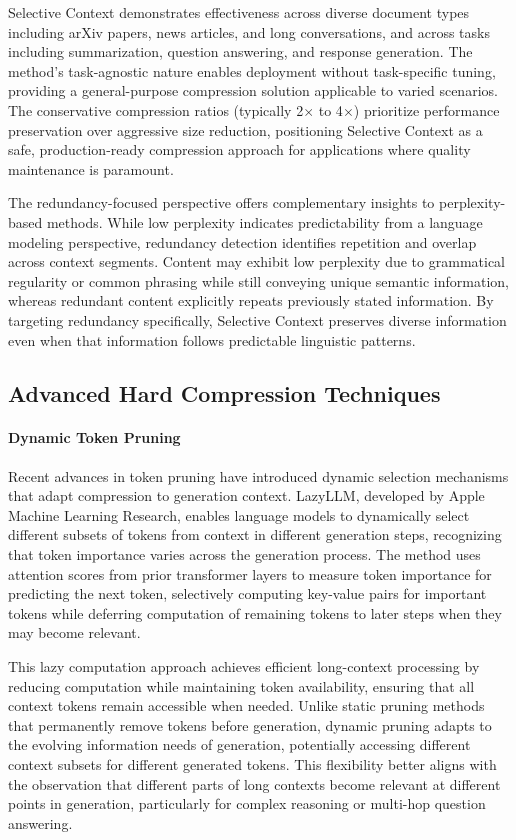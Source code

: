 \documentclass[11pt,letterpaper]{article}
\begin{document}
Selective Context demonstrates effectiveness across diverse document types including arXiv papers, news articles, and long conversations, and across tasks including summarization, question answering, and response generation. The method's task-agnostic nature enables deployment without task-specific tuning, providing a general-purpose compression solution applicable to varied scenarios. The conservative compression ratios (typically 2$\times$ to 4$\times$) prioritize performance preservation over aggressive size reduction, positioning Selective Context as a safe, production-ready compression approach for applications where quality maintenance is paramount.

The redundancy-focused perspective offers complementary insights to perplexity-based methods. While low perplexity indicates predictability from a language modeling perspective, redundancy detection identifies repetition and overlap across context segments. Content may exhibit low perplexity due to grammatical regularity or common phrasing while still conveying unique semantic information, whereas redundant content explicitly repeats previously stated information. By targeting redundancy specifically, Selective Context preserves diverse information even when that information follows predictable linguistic patterns.

\subsection{Advanced Hard Compression Techniques}

\paragraph{Dynamic Token Pruning}

Recent advances in token pruning have introduced dynamic selection mechanisms that adapt compression to generation context. LazyLLM, developed by Apple Machine Learning Research, enables language models to dynamically select different subsets of tokens from context in different generation steps, recognizing that token importance varies across the generation process. The method uses attention scores from prior transformer layers to measure token importance for predicting the next token, selectively computing key-value pairs for important tokens while deferring computation of remaining tokens to later steps when they may become relevant.

This lazy computation approach achieves efficient long-context processing by reducing computation while maintaining token availability, ensuring that all context tokens remain accessible when needed. Unlike static pruning methods that permanently remove tokens before generation, dynamic pruning adapts to the evolving information needs of generation, potentially accessing different context subsets for different generated tokens. This flexibility better aligns with the observation that different parts of long contexts become relevant at different points in generation, particularly for complex reasoning or multi-hop question answering.
\end{document}
